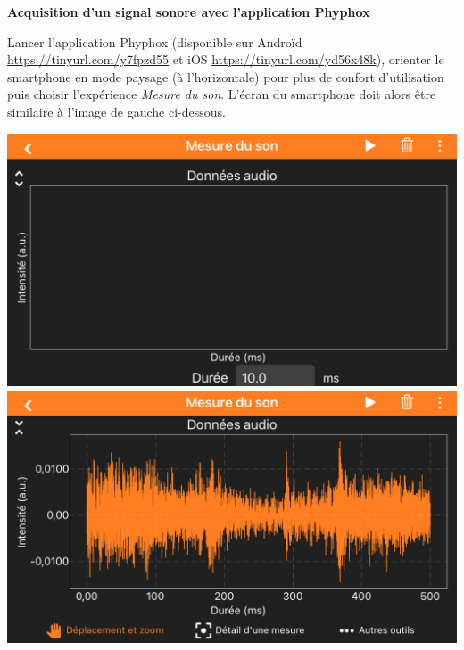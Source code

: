 \documentclass[12pt,a4paper]{article}
\begin{document}

\begin{doc}
\label{doc:phyphox}
\textbf{Acquisition d'un signal sonore avec l'application Phyphox}

Lancer l'application Phyphox (disponible sur Androïd \href{https://play.google.com/store/apps/details?id=de.rwth_aachen.phyphox&hl=fr&gl=US}{https://tinyurl.com/y7fpzd55} et iOS \href{https://apps.apple.com/fr/app/phyphox/id1127319693#?platform=iphone}{https://tinyurl.com/yd56x48k}), orienter le smartphone en mode paysage (à l'horizontale) pour plus de confort d'utilisation puis choisir l'expérience \emph{Mesure du son}.
L'écran du smartphone doit alors être similaire à l'image de gauche ci-dessous.

\begin{center}
\includegraphics[scale=0.2]{images/phyphox1.jpeg}
\includegraphics[scale=0.2]{images/phyphox2.jpeg}
\end{center}


\end{doc}
\end{document}
